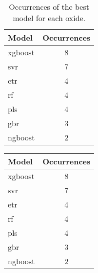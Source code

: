 \begin{table}[H]
\centering
\begin{tabular}{lc}
Model & Occurrences \\
\hline
\gls{xgboost} & 8 \\
\gls{svr} & 7 \\
\gls{etr} & 4 \\
\gls{rf} & 4 \\
\gls{pls} & 4 \\
\gls{gbr} & 3 \\
\gls{ngboost} & 2 \\
\end{tabular}
\caption{Occurrences of the best model for each oxide.}
\label{tab:best_model_occurrences}
\end{table}
\begin{tabular}{lc}
Model & Occurrences \\
\hline
\gls{xgboost} & 8 \\
\gls{svr} & 7 \\
\gls{etr} & 4 \\
\gls{rf} & 4 \\
\gls{pls} & 4 \\
\gls{gbr} & 3 \\
\gls{ngboost} & 2 \\
\end{tabular}
\label{tab:best_model_occurrences}
